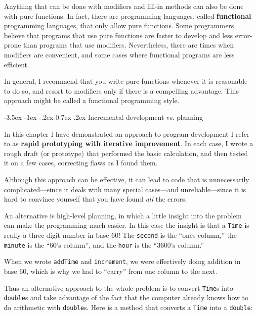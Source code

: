 \documentclass{book}
\makeatletter
\renewcommand{\section}{\@startsection 
    {section} {1} {0mm}%
    {-3.5ex \@plus -1ex \@minus -.2ex}%
    {0.7ex \@plus.2ex}%
    {\normalfont\Large\bfseries}}
\makeatother
\begin{document}
Anything that can be done with modifiers and fill-in methods can also
be done with pure functions.  In fact, there are programming
languages, called {\bf functional} programming languages, that only
allow pure functions.  Some programmers believe that programs that use
pure functions are faster to develop and less error-prone than
programs that use modifiers.  Nevertheless, there are times when
modifiers are convenient, and some cases where functional programs
are less efficient.

In general, I recommend that you write pure functions whenever
it is reasonable to do so, and resort to modifiers only if there
is a compelling advantage.  This approach might be called a
functional programming style.

\section{Incremental development vs. planning}

In this chapter I have demonstrated an approach to program
development I refer to as {\bf rapid prototyping with iterative
improvement}.  In each case, I wrote a rough draft (or prototype)
that performed the basic calculation, and then tested it on
a few cases, correcting flaws as I found them.

Although this approach can be effective, it can lead to code
that is unnecessarily complicated---since it deals with many
special cases---and unreliable---since it is hard to convince
yourself that you have found {\em all} the errors.

An alternative is high-level planning, in which a little insight
into the problem can make the programming much easier.  In
this case the insight is that a {\tt Time} is really a three-digit
number in base 60!  The {\tt second} is the ``ones column,''
the {\tt minute} is the ``60's column'', and the {\tt hour}
is the ``3600's column.''

When we wrote {\tt addTime} and {\tt increment}, we were effectively
doing addition in base 60, which is why we had to ``carry'' from one
column to the next.


Thus an alternative approach to the whole problem is to convert
{\tt Time}s into {\tt double}s and take advantage of the fact that
the computer already knows how to do arithmetic with {\tt double}s.
Here is a method that converts a {\tt Time} into a {\tt double}:
\end{document}

